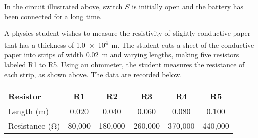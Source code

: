\documentclass{../../oss-apphys-exam}
\begin{document}
\begin{questions}
  \question In the circuit illustrated above, switch $S$ is initially open and
  the battery has been connected for a long time.
  \newpage

  
  \question A physics student wishes to measure the resistivity of slightly
  conductive paper that has a thickness of \SI{1.0e4}{\metre}. The student cuts
  a sheet of the conductive paper into strips of width \SI{.02}{\metre} and
  varying lengths, making five resistors labeled R1 to R5. Using an ohmmeter,
  the student measures the resistance of each strip, as shown above. The data
  are recorded below.
  \begin{center}
    \begin{tabular}{|l|c|c|c|c|c|}
      \hline
      Resistor & R1 & R2 & R3 & R4 & R5 \\ \hline
      Length (m) & 0.020 & 0.040 & 0.060 & 0.080 & 0.100\\ \hline
      Resistance (\si{\ohm}) & 80,000 & 180,000 & 260,000 & 370,000 & 440,000\\
      \hline
    \end{tabular}
  \end{center}
  \begin{parts}

\end{parts}
\end{questions}
\end{document}
